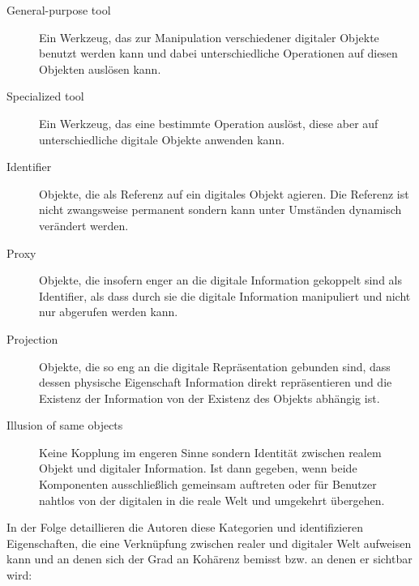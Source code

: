 \begin{description}
	\item[General-purpose tool] Ein Werkzeug, das zur Manipulation verschiedener digitaler Objekte benutzt werden kann und dabei unterschiedliche Operationen auf diesen Objekten auslösen kann.
	\item[Specialized tool] Ein Werkzeug, das eine bestimmte Operation auslöst, diese aber auf unterschiedliche digitale Objekte anwenden kann.
	\item[Identifier] Objekte, die als Referenz auf ein digitales Objekt agieren. Die Referenz ist nicht zwangsweise permanent sondern kann unter Umständen dynamisch verändert werden.
	\item[Proxy] Objekte, die insofern enger an die digitale Information gekoppelt sind als Identifier, als dass durch sie die digitale Information manipuliert und nicht nur abgerufen werden kann. 
	\item[Projection] Objekte, die so eng an die digitale Repräsentation gebunden sind, dass dessen physische Eigenschaft Information direkt repräsentieren und die Existenz der Information von der Existenz des Objekts abhängig ist.
	\item[Illusion of same objects] Keine Kopplung im engeren Sinne sondern Identität zwischen realem Objekt und digitaler Information. Ist dann gegeben, wenn beide Komponenten ausschließlich gemeinsam auftreten oder für Benutzer nahtlos von der digitalen in die reale Welt und umgekehrt übergehen.
\end{description}

In der Folge detaillieren die Autoren diese Kategorien und identifizieren Eigenschaften, die eine Verknüpfung zwischen realer und digitaler Welt aufweisen kann und an denen sich der Grad an Kohärenz bemisst bzw. an denen er sichtbar wird:

